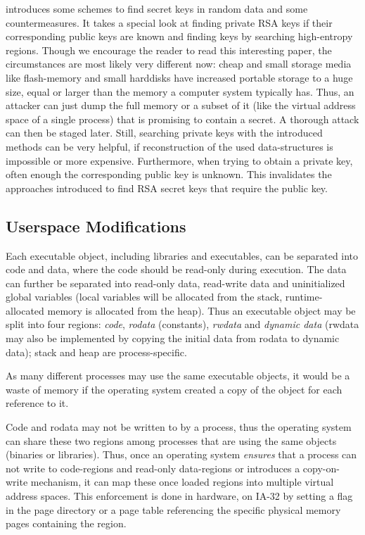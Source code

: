 \cite{hide_n_seek:1998} introduces some schemes to find secret keys in random
data and some countermeasures. It takes a special look at finding private RSA
keys if their corresponding public keys are known and finding keys by searching
high-entropy regions. Though we encourage the reader to read this interesting
paper, the circumstances are most likely very different now: cheap and small
storage media like flash-memory and small harddisks have increased portable
storage to a huge size, equal or larger than the memory a computer system
typically has. Thus, an attacker can just dump the full memory or a subset of it
(like the virtual address space of a single process) that is promising to
contain a secret. A thorough attack can then be staged later.  Still, searching
private keys with the introduced methods can be very helpful, if reconstruction
of the used data-structures is impossible or more expensive. Furthermore, when
trying to obtain a private key, often enough the corresponding public key is
unknown. This invalidates the approaches introduced to find RSA secret keys that
require the public key.




\subsection{Userspace Modifications}

\label{userspace_attacks}

Each executable object, including libraries and executables, can be separated
into code and data, where the code should be read-only during execution. The
data can further be separated into read-only data, read-write data and
uninitialized global variables (local variables will be allocated from the
stack, runtime-allocated memory is allocated from the heap).  Thus an executable
object may be split into four regions: \emph{code}, \emph{rodata} (constants),
\emph{rwdata} and \emph{dynamic data} (rwdata may also be implemented by copying
the initial data from rodata to dynamic data); stack and heap are
process-specific.

As many different processes may use the same executable objects, it would be a
waste of memory if the operating system created a copy of the object for each
reference to it.

Code and rodata may not be written to by a process, thus the operating system
can share these two regions among processes that are using the same objects
(binaries or libraries).  Thus, once an operating system \emph{ensures} that a
process can not write to code-regions and read-only data-regions or introduces a
copy-on-write mechanism, it can map these once loaded regions into multiple
virtual address spaces.  This enforcement is done in hardware, on IA-32 by
setting a flag in the page directory or a page table referencing the specific
physical memory pages containing the region.

